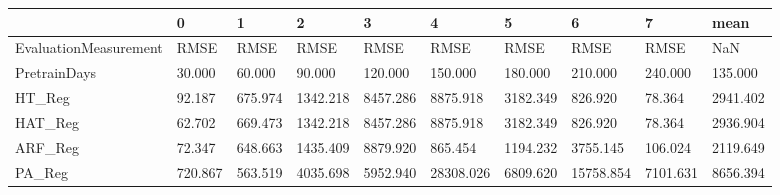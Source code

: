 \begin{tabular}{llllllllll}
\toprule
{} &       0 &       1 &        2 &        3 &         4 &        5 &         6 &        7 &     mean \\
\midrule
EvaluationMeasurement &    RMSE &    RMSE &     RMSE &     RMSE &      RMSE &     RMSE &      RMSE &     RMSE &      NaN \\
PretrainDays          &  30.000 &  60.000 &   90.000 &  120.000 &   150.000 &  180.000 &   210.000 &  240.000 &  135.000 \\
HT\_Reg                &  92.187 & 675.974 & 1342.218 & 8457.286 &  8875.918 & 3182.349 &   826.920 &   78.364 & 2941.402 \\
HAT\_Reg               &  62.702 & 669.473 & 1342.218 & 8457.286 &  8875.918 & 3182.349 &   826.920 &   78.364 & 2936.904 \\
ARF\_Reg               &  72.347 & 648.663 & 1435.409 & 8879.920 &   865.454 & 1194.232 &  3755.145 &  106.024 & 2119.649 \\
PA\_Reg                & 720.867 & 563.519 & 4035.698 & 5952.940 & 28308.026 & 6809.620 & 15758.854 & 7101.631 & 8656.394 \\
\bottomrule
\end{tabular}

